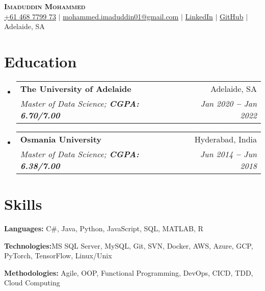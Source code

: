 \documentclass[letterpaper,11pt]{article}
\makeatletter
\newcommand{\resumeEducationHeading}[6]{
  \vspace{-2pt}\item
    \begin{tabular*}{0.97\textwidth}[t]{l@{\extracolsep{\fill}}r}
      \textbf{#1} & #2 \\
      \textit{\small#3} & \textit{\small #4} \\
    \end{tabular*}\vspace{-5pt}
}
\newcommand{\resumeSubHeadingListStart}{\begin{itemize}[leftmargin=0.15in, label={}]}
\newcommand{\resumeSubHeadingListEnd}{\end{itemize}}
\makeatother
\begin{document}

\begin{center}
    \textbf{\Huge \scshape Imaduddin Mohammed} \\ \vspace{3pt}
    \small
    \faMobile \hspace{.5pt} \href{tel:61468779973}{+61 468 7799 73}
    $|$
    \faAt \hspace{.5pt} \href{mailto:mohammed.imaduddin01@gmail.com}{mohammed.imaduddin01@gmail.com}
    $|$
    \faLinkedinSquare \hspace{.5pt} \href{https://www.linkedin.com/in/mohammed-imaduddin-4a1527149}{LinkedIn}
    $|$
    \faGithub \hspace{.5pt} \href{https://github.com/Imad-7000}{GitHub}
    $|$
    {Adelaide, SA}
\end{center}




\section{Education}
  \vspace{3pt}
  \resumeSubHeadingListStart
    
    \resumeEducationHeading
      {The University of Adelaide
      }{Adelaide, SA}
      {Master of Data Science;   \textbf{CGPA: 6.70/7.00}}{Jan 2020 \textbf{--} Jan 2022}
      {}{}
   \resumeEducationHeading
      {Osmania University
      }{Hyderabad, India}
      {Master of Data Science;   \textbf{CGPA: 6.38/7.00}}{Jun 2014 \textbf{--} Jun 2018}
      {}{}
  \resumeSubHeadingListEnd




\section{Skills}
  \vspace{2pt}
  \resumeSubHeadingListStart
    \small{\item{
        
        \textbf{Languages:}{ C\#, Java, Python, JavaScript, SQL, MATLAB, R} \\ \vspace{3pt}
        
        \textbf{Technologies:}{MS SQL Server, MySQL, Git, SVN, Docker, AWS, Azure, GCP, PyTorch, TensorFlow, Linux/Unix } \\ \vspace{3pt}
        
        \textbf{Methodologies:}{ Agile, OOP, Functional Programming, DevOps, CICD, TDD, Cloud Computing} \\ \vspace{3pt}
        
    }}
  \resumeSubHeadingListEnd
\end{document}

